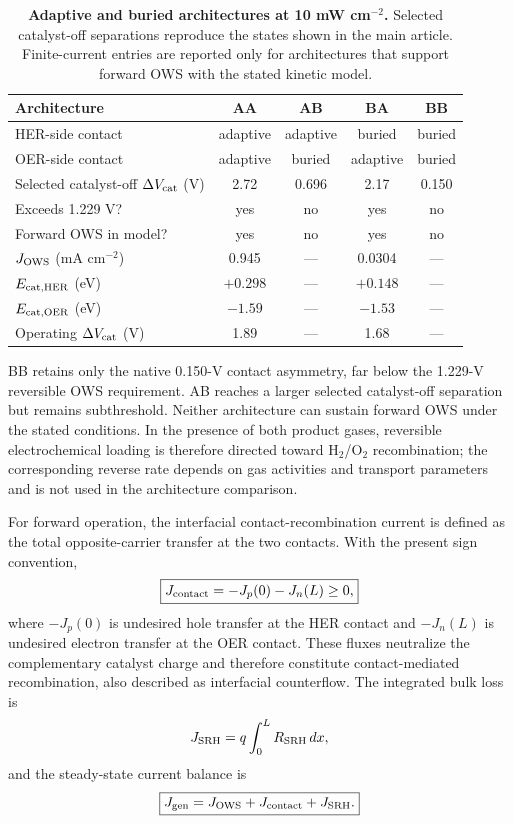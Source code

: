 \documentclass[11pt]{article}
\begin{document}
\begin{table}[ht]
\centering
\caption{\textbf{Adaptive and buried architectures at 10 mW cm$^{-2}$.} Selected catalyst-off separations reproduce the states shown in the main article. Finite-current entries are reported only for architectures that support forward OWS with the stated kinetic model.}
\label{tab:architectures}
\small
\begin{tabular}{@{}lcccc@{}}
\toprule
Architecture & AA & AB & BA & BB \\
\midrule
HER-side contact & adaptive & adaptive & buried & buried \\
OER-side contact & adaptive & buried & adaptive & buried \\
Selected catalyst-off $\Delta V_{\rm cat}$ (V) & 2.72 & 0.696 & 2.17 & 0.150 \\
Exceeds 1.229 V? & yes & no & yes & no \\
Forward OWS in model? & yes & no & yes & no \\
$J_{\rm OWS}$ (mA cm$^{-2}$) & 0.945 & --- & 0.0304 & --- \\
$E_{\rm cat,HER}$ (eV) & $+0.298$ & --- & $+0.148$ & --- \\
$E_{\rm cat,OER}$ (eV) & $-1.59$ & --- & $-1.53$ & --- \\
Operating $\Delta V_{\rm cat}$ (V) & 1.89 & --- & 1.68 & --- \\
\bottomrule
\end{tabular}
\end{table}

BB retains only the native 0.150-V contact asymmetry, far below the 1.229-V reversible OWS requirement. AB reaches a larger selected catalyst-off separation but remains subthreshold. Neither architecture can sustain forward OWS under the stated conditions. In the presence of both product gases, reversible electrochemical loading is therefore directed toward H$_2$/O$_2$ recombination; the corresponding reverse rate depends on gas activities and transport parameters and is not used in the architecture comparison.

For forward operation, the interfacial contact-recombination current is defined as the total opposite-carrier transfer at the two contacts. With the present sign convention,
\begin{equation}
\boxed{J_{\rm contact}=-J_p(0)-J_n(L)\geq 0,}
\label{eq:contact-recombination}
\end{equation}
where $-J_p(0)$ is undesired hole transfer at the HER contact and $-J_n(L)$ is undesired electron transfer at the OER contact. These fluxes neutralize the complementary catalyst charge and therefore constitute contact-mediated recombination, also described as interfacial counterflow. The integrated bulk loss is
\begin{equation}
J_{\rm SRH}=q\int_0^L R_{\rm SRH}\,dx,
\end{equation}
and the steady-state current balance is
\begin{equation}
\boxed{J_{\rm gen}=J_{\rm OWS}+J_{\rm contact}+J_{\rm SRH}.}
\label{eq:current-balance}
\end{equation}
\end{document}

